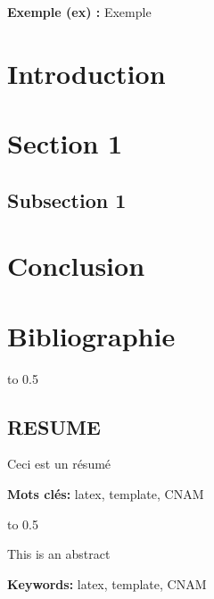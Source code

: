 \documentclass[12pt]{article}
\begin{document}
\textbf{Exemple (ex) :} Exemple\\

\newpage 

\section*{Introduction}

\newpage

\section{Section 1}
\subsection{Subsection 1}

\newpage

\section{Conclusion}

\newpage

\begingroup
\setlength{\parindent}{0pt}  %

\section*{Bibliographie}

\endgroup  %

\newpage


\centerline{\hbox to 0.5\textwidth{\hrulefill}}

\begin{center}

\section*{RESUME}

\end{center}

Ceci est un résumé

\textbf{Mots clés:} latex, template, CNAM\\

\centerline{\hbox to 0.5\textwidth{\hrulefill}}

\begin{center}


\end{center}

This is an abstract

\textbf{Keywords:} latex, template, CNAM
\end{document}
